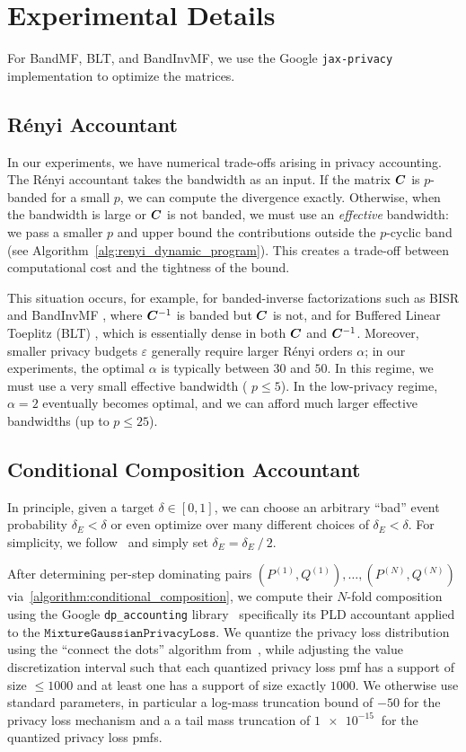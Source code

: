 \documentclass{article}
\theoremstyle{plain}
\theoremstyle{definition}
\theoremstyle{remark}
\begin{document}
\section{Experimental Details}\label{appendix:experimental_setup}
For BandMF, BLT, and BandInvMF, we use the Google \texttt{jax-privacy} implementation \citep{jaxprivacy2022github} to optimize the matrices.


\subsection{R\'enyi Accountant}
In our experiments, we have numerical trade-offs arising in privacy accounting. The R\'enyi accountant takes the bandwidth as an input. If the matrix ${\bm{C}}$ is $p$-banded for a small $p$, we can compute the divergence exactly. Otherwise, when the bandwidth is large or ${\bm{C}}$ is not banded, we must use an \emph{effective} bandwidth: we pass a smaller $p$ and upper bound the contributions outside the $p$-cyclic band (see Algorithm~\ref{alg:renyi_dynamic_program}). This creates a trade-off between computational cost and the tightness of the bound.

This situation occurs, for example, for banded-inverse factorizations such as BISR and BandInvMF \citep{kalinin2025back}, where ${\bm{C}}^{-1}$ is banded but ${\bm{C}}$ is not, and for Buffered Linear Toeplitz (BLT) \citep{dvijotham2024efficient}, which is essentially dense in both ${\bm{C}}$ and ${\bm{C}}^{-1}$. Moreover, smaller privacy budgets $\varepsilon$ generally require larger R\'enyi orders $\alpha$; in our experiments, the optimal $\alpha$ is typically between $30$ and $50$. In this regime, we must use a very small effective bandwidth ( $p \le 5$). In the low-privacy regime, $\alpha=2$ eventually becomes optimal, and we can afford much larger effective bandwidths (up to $p \le 25$).

\subsection{Conditional Composition Accountant}
In principle, given a target $\delta \in [0,1]$, we can choose an arbitrary ``bad'' event probability $\delta_E < \delta$
or even optimize over many different choices of $\delta_E < \delta$.
For simplicity, we follow~\cite{choquette2023privacy} and simply set $\delta_E = \delta_E \mathbin{/} 2$.

After determining per-step dominating pairs $(P^{(1)}, Q^{(1)}), \dots, (P^{(N)}, Q^{(N)})$ via~\cref{algorithm:conditional_composition}, we compute their $N$-fold composition using the Google \texttt{dp\_accounting} library~\cite{dpaccountinglibrary}  specifically its PLD accountant applied to the $\texttt{MixtureGaussianPrivacyLoss}$.
We quantize the privacy loss distribution using the ``connect the dots'' algorithm from~\cite{doroshenko2022connect},
while adjusting the value discretization interval such that each quantized privacy loss pmf has a support of size $\leq 1000$
and at least one has a support of size exactly $1000$.
We otherwise use standard parameters, in particular a log-mass truncation bound of $-50$ for the privacy loss mechanism and a 
a tail mass truncation of $\SI{1e-15}{}$ for the quantized privacy loss pmfs. 
\end{document}
